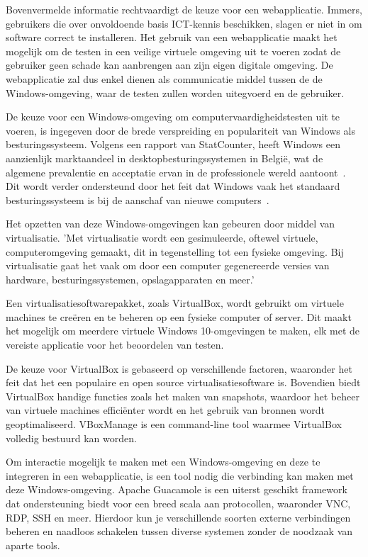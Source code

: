 Bovenvermelde informatie rechtvaardigt de keuze voor een webapplicatie. Immers, gebruikers die over onvoldoende basis ICT-kennis beschikken, slagen er niet in om software correct te installeren. Het gebruik van een webapplicatie maakt het mogelijk om de testen in een veilige virtuele omgeving uit te voeren zodat de gebruiker geen schade kan aanbrengen aan zijn eigen digitale omgeving. De webapplicatie zal dus enkel dienen als communicatie middel tussen de de Windows-omgeving, waar de testen zullen worden uitegvoerd en de gebruiker.

De keuze voor een Windows-omgeving om computervaardigheidstesten uit te voeren, is ingegeven door de brede verspreiding en populariteit van Windows als besturingssysteem. Volgens een rapport van StatCounter, heeft Windows een aanzienlijk marktaandeel in desktopbesturingssystemen in België, wat de algemene prevalentie en acceptatie ervan in de professionele wereld aantoont~\autocite{StatCounterOSMarketShare}. Dit wordt verder ondersteund door het feit dat Windows vaak het standaard besturingssysteem is bij de aanschaf van nieuwe computers~\autocite{ProfolusWindowsPopularity}.

Het opzetten van deze Windows-omgevingen kan gebeuren door middel van virtualisatie. 'Met virtualisatie wordt een gesimuleerde, oftewel virtuele, computeromgeving gemaakt, dit in tegenstelling tot een fysieke omgeving. Bij virtualisatie gaat het vaak om door een computer gegenereerde versies van hardware, besturingssystemen, opslagapparaten en meer.'\autocite{MicrosoftVirtualisationDefinition}

Een virtualisatiesoftwarepakket, zoals VirtualBox, wordt gebruikt om virtuele machines te creëren en te beheren op een fysieke computer of server. Dit maakt het mogelijk om meerdere virtuele Windows 10-omgevingen te maken, elk met de vereiste applicatie voor het beoordelen van testen.

De keuze voor VirtualBox is gebaseerd op verschillende factoren, waaronder het feit dat het een populaire en open source virtualisatiesoftware is. Bovendien biedt VirtualBox handige functies zoals het maken van snapshots, waardoor het beheer van virtuele machines efficiënter wordt en het gebruik van bronnen wordt geoptimaliseerd. VBoxManage is een command-line tool waarmee VirtualBox volledig bestuurd kan worden.


Om interactie mogelijk te maken met een Windows-omgeving en deze te integreren in een webapplicatie, is een tool nodig die verbinding kan maken met deze Windows-omgeving. Apache Guacamole is een uiterst geschikt framework dat ondersteuning biedt voor een breed scala aan protocollen, waaronder VNC, RDP, SSH en meer. Hierdoor kun je verschillende soorten externe verbindingen beheren en naadloos schakelen tussen diverse systemen zonder de noodzaak van aparte tools.

